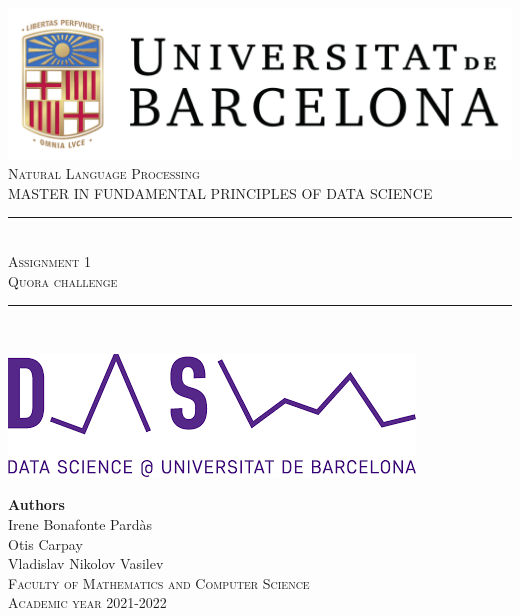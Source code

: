 \documentclass[11pt,a4paper]{article}
\newcommand{\subject}{Natural Language Processing}
\newcommand{\titulo}{Assignment 1}
\newcommand{\subtitulo}{Quora challenge}
\newcommand{\masters}{Master in Fundamental Principles of Data Science}
\begin{document}

\begin{titlepage}
  \begin{minipage}{\textwidth}
    \centering
    \includegraphics[scale=0.25]{img/ub-logo}\\[2cm]
    
    \textsc{\Large \subject\\[0.5cm]}
    \textsc{\uppercase\expandafter{\masters}}\\[1.5cm]
    
    \noindent\rule[-1ex]{\textwidth}{1pt}\\[1.5ex]
    \textsc{{\Huge \titulo\\[0.5ex]}}
    \textsc{{\Large \subtitulo\\}}
    \noindent\rule[-1ex]{\textwidth}{2pt}\\[3.5ex]
  \end{minipage}
  
  \vspace{2cm}
  
  \begin{minipage}{\textwidth}
    \centering
    
    \includegraphics[scale=0.4]{img/ub-ds-logo}
    \vspace{2cm}
    
    \textbf{Authors}\\ {Irene Bonafonte Pardàs}\\{Otis Carpay}\\{Vladislav Nikolov Vasilev}\\[2.5ex]
    \textsc{Faculty of Mathematics and Computer Science}\\
    \vspace{1em}
    \textsc{Academic year 2021-2022}
  \end{minipage}
\end{titlepage}
\end{document}
